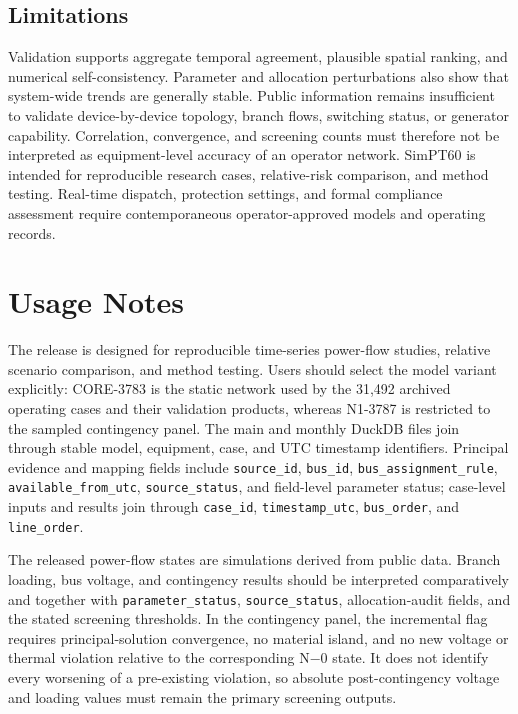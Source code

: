 \documentclass[
  10pt]{article}
\begin{document}
\subsection{Limitations}\label{limitations}

Validation supports aggregate temporal agreement, plausible spatial
ranking, and numerical self-consistency. Parameter and allocation
perturbations also show that system-wide trends are generally stable.
Public information remains insufficient to validate device-by-device
topology, branch flows, switching status, or generator capability.
Correlation, convergence, and screening counts must therefore not be
interpreted as equipment-level accuracy of an operator network. SimPT60
is intended for reproducible research cases, relative-risk comparison,
and method testing. Real-time dispatch, protection settings, and formal
compliance assessment require contemporaneous operator-approved models
and operating records.

\section{Usage Notes}\label{usage-notes}

The release is designed for reproducible time-series power-flow studies,
relative scenario comparison, and method testing. Users should select
the model variant explicitly: CORE-3783 is the static network used by
the 31,492 archived operating cases and their validation products,
whereas N1-3787 is restricted to the sampled contingency panel. The main
and monthly DuckDB files join through stable model, equipment, case, and
UTC timestamp identifiers. Principal evidence and mapping fields include
\texttt{source\_id}, \texttt{bus\_id}, \texttt{bus\_assignment\_rule},
\texttt{available\_from\_utc}, \texttt{source\_status}, and field-level
parameter status; case-level inputs and results join through
\texttt{case\_id}, \texttt{timestamp\_utc}, \texttt{bus\_order}, and
\texttt{line\_order}.

The released power-flow states are simulations derived from public data.
Branch loading, bus voltage, and contingency results should be
interpreted comparatively and together with \texttt{parameter\_status},
\texttt{source\_status}, allocation-audit fields, and the stated
screening thresholds. In the contingency panel, the incremental flag
requires principal-solution convergence, no material island, and no new
voltage or thermal violation relative to the corresponding N−0 state. It
does not identify every worsening of a pre-existing violation, so
absolute post-contingency voltage and loading values must remain the
primary screening outputs.
\end{document}
